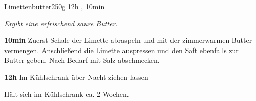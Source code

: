 \documentclass[../recipe-collections/cooking.tex]{subfiles}
\begin{document}
\begin{recipe}{Limettenbutter}{250g }{12h , 10min }

  \freeform{}\textit{Ergibt eine erfrischend saure Butter.}


  \textbf{10min}
  Zuerst Schale der Limette abraspeln und mit der zimmerwarmen Butter vermengen.
  Anschließend die Limette auspressen und den Saft ebenfalls zur Butter geben.
  Nach Bedarf mit Salz abschmecken.

  \newstep{}\textbf{12h}
  Im Kühlschrank über Nacht ziehen lassen

  \freeform{}\hrulefill{}

  \freeform{}
  Hält sich im Kühlschrank ca. 2 Wochen.

\end{recipe}
\end{document}
